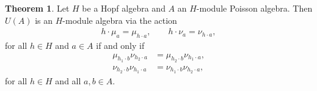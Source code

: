\documentclass[reqno]{amsart}
\numberwithin{equation}{section}
\theoremstyle{definition}
\newtheorem{theorem}{Theorem}[section]
\begin{document}
\begin{theorem}\label{thm.enveloping}
Let $H$ be a Hopf algebra and $A$ an $H$-module Poisson algebra.
Then $U(A)$ is an $H$-module algebra via the action
\begin{align}\label{eq.hopf_ext}
	h \cdot \mu_a = \mu_{h \cdot a}, \qquad 
    h \cdot \nu_a = \nu_{h \cdot a},
\end{align}
for all $h \in H$ and $a \in A$ if and only if 
\begin{align}
\label{eq.hopf_ext_cond1}
\mu_{h_1 \cdot b}\nu_{h_2 \cdot a} &= \mu_{h_2 \cdot b} \nu_{h_1 \cdot a}, \\
\label{eq.hopf_ext_cond2}
\nu_{h_2 \cdot b}\nu_{h_1 \cdot a} &= \nu_{h_1 \cdot b}\nu_{ h_2 \cdot a},
\end{align}
for all $h \in H$ and all $a,b \in A$.
\end{theorem}
\end{document}
